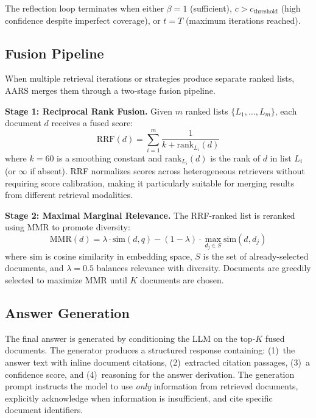 \documentclass[runningheads]{llncs}
\begin{document}
The reflection loop terminates when either $\beta = 1$ (sufficient), $c > c_{\text{threshold}}$ (high confidence despite imperfect coverage), or $t = T$ (maximum iterations reached).

\subsection{Fusion Pipeline}

When multiple retrieval iterations or strategies produce separate ranked lists, AARS merges them through a two-stage fusion pipeline.

\textbf{Stage 1: Reciprocal Rank Fusion.} Given $m$ ranked lists $\{L_1, \ldots, L_m\}$, each document $d$ receives a fused score:
\begin{equation}
\text{RRF}(d) = \sum_{i=1}^{m} \frac{1}{k + \text{rank}_{L_i}(d)}
\end{equation}
where $k = 60$ is a smoothing constant and $\text{rank}_{L_i}(d)$ is the rank of $d$ in list $L_i$ (or $\infty$ if absent). RRF normalizes scores across heterogeneous retrievers without requiring score calibration, making it particularly suitable for merging results from different retrieval modalities.

\textbf{Stage 2: Maximal Marginal Relevance.} The RRF-ranked list is reranked using MMR to promote diversity:
\begin{equation}
\text{MMR}(d) = \lambda \cdot \text{sim}(d, q) - (1 - \lambda) \cdot \max_{d_j \in S} \text{sim}(d, d_j)
\end{equation}
where $\text{sim}$ is cosine similarity in embedding space, $S$ is the set of already-selected documents, and $\lambda = 0.5$ balances relevance with diversity. Documents are greedily selected to maximize MMR until $K$ documents are chosen.

\subsection{Answer Generation}

The final answer is generated by conditioning the LLM on the top-$K$ fused documents. The generator produces a structured response containing: (1)~the answer text with inline document citations, (2)~extracted citation passages, (3)~a confidence score, and (4)~reasoning for the answer derivation. The generation prompt instructs the model to use \textit{only} information from retrieved documents, explicitly acknowledge when information is insufficient, and cite specific document identifiers.
\end{document}
